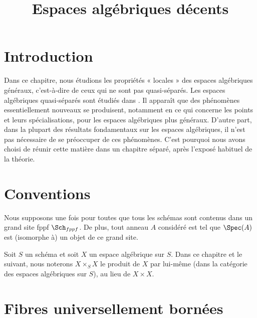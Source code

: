 

%


\title{Espaces algébriques décents}


\maketitle

\label{section-phantom}

\tableofcontents

\section{Introduction}
\label{section-introduction}

\noindent
Dans ce chapitre, nous étudions les propriétés « locales » des espaces
algébriques généraux, c'est-à-dire de ceux qui ne sont pas quasi-séparés.
Les espaces algébriques quasi-séparés sont étudiés dans \cite{Kn}.
Il apparaît que des phénomènes essentiellement nouveaux se produisent,
notamment en ce qui concerne les points et leurs spécialisations, pour les
espaces algébriques plus généraux. D'autre part, dans la plupart des résultats
fondamentaux sur les espaces algébriques, il n'est pas nécessaire de se
préoccuper de ces phénomènes. C'est pourquoi nous avons choisi de réunir cette
matière dans un chapitre séparé, après l'exposé habituel de la théorie.



\section{Conventions}
\label{section-conventions}

\noindent
Nous supposons une fois pour toutes que tous les schémas sont contenus dans
un grand site fppf $\Sch_{fppf}$. De plus, tout anneau $A$ considéré est tel
que $\Spec(A)$ est (isomorphe à) un objet de ce grand site.

\medskip\noindent
Soit $S$ un schéma et soit $X$ un espace algébrique sur $S$.
Dans ce chapitre et le suivant, nous noterons $X \times_S X$ le produit de $X$
par lui-même (dans la catégorie des espaces algébriques sur $S$), au lieu de
$X \times X$.



\section{Fibres universellement bornées}
\label{section-universally-bounded}

